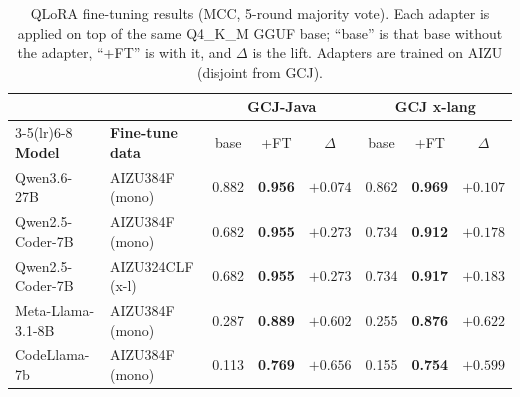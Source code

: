 \begin{table}[htbp]
  \centering
  \caption{QLoRA fine-tuning results (MCC, 5-round majority vote). Each adapter is applied on top of the same Q4\_K\_M GGUF base; ``base'' is that base without the adapter, ``+FT'' is with it, and $\Delta$ is the lift. Adapters are trained on AIZU (disjoint from GCJ).}
  \label{tab:finetune_results}
  \small
  \begin{tabular}{ll ccc ccc}
    \toprule
    & & \multicolumn{3}{c}{\textbf{GCJ-Java}} & \multicolumn{3}{c}{\textbf{GCJ x-lang}} \\
    \cmidrule(lr){3-5}\cmidrule(lr){6-8}
    \textbf{Model} & \textbf{Fine-tune data} & base & +FT & $\Delta$ & base & +FT & $\Delta$ \\
    \midrule
    Qwen3.6-27B & AIZU384F (mono) & 0.882 & \textbf{0.956} & $+0.074$ & 0.862 & \textbf{0.969} & $+0.107$ \\
    Qwen2.5-Coder-7B & AIZU384F (mono) & 0.682 & \textbf{0.955} & $+0.273$ & 0.734 & \textbf{0.912} & $+0.178$ \\
    Qwen2.5-Coder-7B & AIZU324CLF (x-l) & 0.682 & \textbf{0.955} & $+0.273$ & 0.734 & \textbf{0.917} & $+0.183$ \\
    Meta-Llama-3.1-8B & AIZU384F (mono) & 0.287 & \textbf{0.889} & $+0.602$ & 0.255 & \textbf{0.876} & $+0.622$ \\
    CodeLlama-7b & AIZU384F (mono) & 0.113 & \textbf{0.769} & $+0.656$ & 0.155 & \textbf{0.754} & $+0.599$ \\
    \bottomrule
  \end{tabular}
\end{table}
